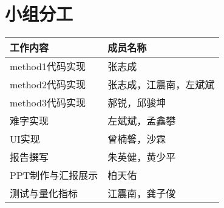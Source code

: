 \documentclass[12pt,hyperref,a4paper,UTF8]{ctexart}
\begin{document}
\section{小组分工}
\begin{longtable}{>{\centering\arraybackslash}p{} >{\centering\arraybackslash}p{}} %
    \toprule
    \textbf{工作内容} & \textbf{成员名称} \\ %
    \midrule
    method1代码实现 & 张志成 \\
    method2代码实现 & 张志成，江震南，左斌斌 \\
    method3代码实现 & 郝锐，邱骏坤 \\
    难字实现 & 左斌斌，孟鑫攀​ \\
    UI实现 & 曾楠馨，沙霖 \\
    报告撰写 & 朱英健，黄少平 \\
    PPT制作与汇报展示 & 柏天佑 \\
    测试与量化指标 & 江震南，龚子俊 \\
    \bottomrule
\end{longtable}


\end{document}
